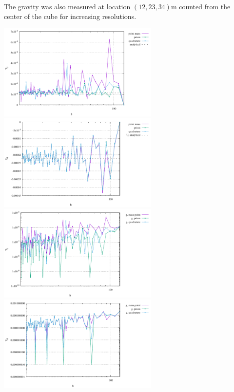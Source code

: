 The gravity was also measured at location $(12,23,34)\si{\metre}$ counted from the center of the cube
for increasing resolutions. 

\begin{center}
\includegraphics[width=8cm]{python_codes/fieldstone_84/cube/single_point_g.pdf}
\includegraphics[width=8cm]{python_codes/fieldstone_84/cube/single_point_U.pdf}\\
\includegraphics[width=8cm]{python_codes/fieldstone_84/cube/single_point_g_error.pdf}
\includegraphics[width=8cm]{python_codes/fieldstone_84/cube/single_point_U_error.pdf}\\
\end{center}


